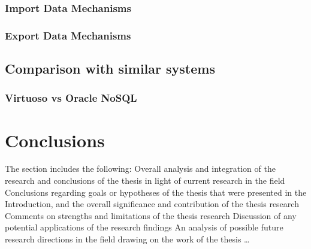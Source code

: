 \subsection{Import Data Mechanisms}

\subsection{Export Data Mechanisms}

\section{Comparison with similar systems}
\subsection{Virtuoso vs Oracle NoSQL}

\chapter{Conclusions}
The section includes the following:
 Overall analysis and integration of the research and conclusions of the thesis in light of current research in the field
 Conclusions regarding goals or hypotheses of the thesis that were presented in the Introduction, and the overall significance and contribution of the thesis research
 Comments on strengths and limitations of the thesis research
 Discussion of any potential applications of the research findings
 An analysis of possible future research directions in the field drawing on the work of the thesis
\ldots